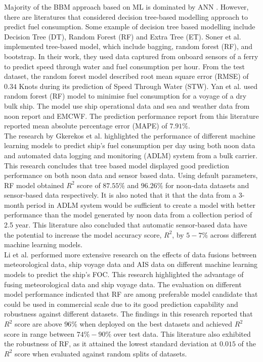 Majority of the BBM approach based on ML is dominated by ANN \citep{Yan.2021}. However, there are literatures that considered decision tree-based modelling approach to predict fuel consumption. Some example of decision tree based modelling include Decision Tree (DT), Random Forest (RF) and Extra Tree (ET). Soner et al. \citep{Soner.2018} implemented tree-based model, which include bagging, random forest (RF), and bootstrap. In their work, they used data captured from onboard sensors of a ferry to predict speed through water and fuel consumption per hour. From the test dataset, the random forest model described root mean square error (RMSE) of $0.34$ Knots during its prediction of Speed Through Water (STW). Yan et al. \citep{Yan.2020} used random forest (RF) model to minimise fuel consumption for a voyage of a dry bulk ship. The model use ship operational data and sea and weather data from noon report and EMCWF. The prediction performance report from this literature reported mean absolute percentage error (MAPE) of $7.91\%$.\\      

The research by Gkerekos et al. \citep{Gkerekos.2019} highlighted the performance of different machine learning models to predict ship's fuel consumption per day using both noon data and automated data logging and monitoring (ADLM) system from a bulk carrier. This research concludes that tree based model displayed good prediction performance on both noon data and sensor based data. Using default parameters, RF model obtained $R^2$ score of $87.55\%$ and $96.26\%$ for noon-data datasets and sensor-based data respectively. It is also noted that it that the data from a 3-month period in ADLM system would be sufficient to create a model with better performance than the model generated by noon data from a collection period of 2.5 year. This literature also concluded that automatic sensor-based data have the potential to increase the model accuracy score, $R^2$, by $5-7\%$ across different machine learning models.\\

Li et al. \citep{Li.2022} performed more extensive research on the effects of data fusions between meteorological data, ship voyage data and AIS data on different machine learning models to predict the ship's FOC. This research highlighted the advantage of fusing meteorological data and ship voyage data. The evaluation on different model performance indicated that RF are among preferable model candidate that could be used in commercial scale due to its good prediction capability and robustness against different datasets. The findings in this research reported that $R^2$ score are above $96\%$ when deployed on the best datasets and achieved $R^2$ score in range between $74\% - 90\%$ over test data. This literature also exhibited the robustness of RF, as it attained the lowest standard deviation at $0.015$ of the $R^2$ score when evaluated against random splits of datasets.\\

